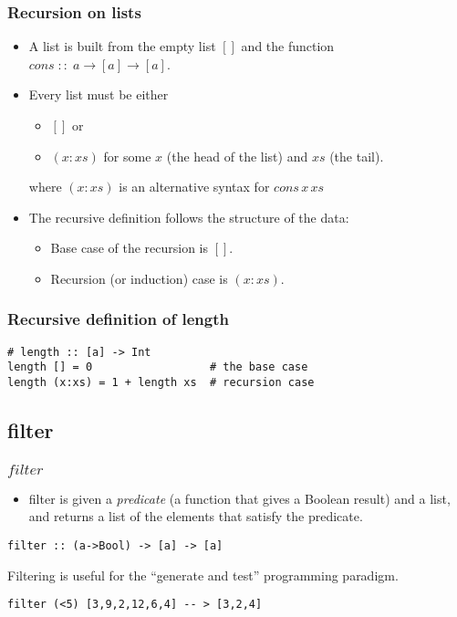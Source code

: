 \documentclass{beamer}
\begin{document}
\begin{frame}[fragile]
\frametitle{Recursion on lists}

\begin{itemize}
\item A list is built from the empty list $[]$ and the function $cons\;::\; a\rightarrow [a] \rightarrow [a] $.
\item Every list must be either
  \begin{itemize}
  \item $[]$  or
  \item $(x : xs)$ for some $x$ (the head of the list) and $xs$ (the
    tail).
  \end{itemize}
where  $(x :xs)$ is an alternative syntax for $cons\,x\, xs$
\item The recursive definition follows the structure of the data:
  \begin{itemize}
  \item Base case of the recursion is $[]$.
  \item Recursion (or induction) case is $(x : xs)$.
  \end{itemize}

\end{itemize}

\end{frame}


\begin{frame}[fragile]
\frametitle{Recursive definition of length}

\begin{verbatim}
# length :: [a] -> Int
length [] = 0                  # the base case
length (x:xs) = 1 + length xs  # recursion case
\end{verbatim}

\end{frame}

\subsection{filter}
\begin{frame}[fragile]
\frametitle{$filter$}

\begin{itemize}
\item filter is given a \emph{predicate} (a function that gives a
  Boolean result) and a list, and returns a list of the elements
  that satisfy the predicate.
\end{itemize}

\begin{verbatim}
filter :: (a->Bool) -> [a] -> [a]
\end{verbatim}

Filtering is useful for the ``generate and test'' programming
paradigm.

\begin{verbatim}
filter (<5) [3,9,2,12,6,4] -- > [3,2,4]
\end{verbatim}

\end{frame}
\end{document}

